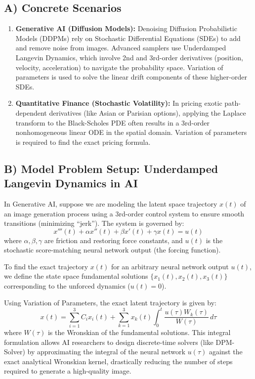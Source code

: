 \documentclass[12pt]{article}
\begin{document}
\subsection{A) Concrete Scenarios}
\begin{enumerate}
    \item \textbf{Generative AI (Diffusion Models):} Denoising Diffusion Probabilistic Models (DDPMs) rely on Stochastic Differential Equations (SDEs) to add and remove noise from images. Advanced samplers use Underdamped Langevin Dynamics, which involve 2nd and 3rd-order derivatives (position, velocity, acceleration) to navigate the probability space. Variation of parameters is used to solve the linear drift components of these higher-order SDEs.
    \item \textbf{Quantitative Finance (Stochastic Volatility):} In pricing exotic path-dependent derivatives (like Asian or Parisian options), applying the Laplace transform to the Black-Scholes PDE often results in a 3rd-order nonhomogeneous linear ODE in the spatial domain. Variation of parameters is required to find the exact pricing formula.
\end{enumerate}

\subsection{B) Model Problem Setup: Underdamped Langevin Dynamics in AI}
In Generative AI, suppose we are modeling the latent space trajectory $x(t)$ of an image generation process using a 3rd-order control system to ensure smooth transitions (minimizing ``jerk''). The system is governed by:
\[ x'''(t) + \alpha x''(t) + \beta x'(t) + \gamma x(t) = u(t) \]
where $\alpha, \beta, \gamma$ are friction and restoring force constants, and $u(t)$ is the stochastic score-matching neural network output (the forcing function).

To find the exact trajectory $x(t)$ for an arbitrary neural network output $u(t)$, we define the state space fundamental solutions $\{x_1(t), x_2(t), x_3(t)\}$ corresponding to the unforced dynamics ($u(t)=0$). 

Using Variation of Parameters, the exact latent trajectory is given by:
\[ x(t) = \sum_{i=1}^3 C_i x_i(t) + \sum_{k=1}^3 x_k(t) \int_0^t \frac{u(\tau) W_k(\tau)}{W(\tau)} \, d\tau \]
where $W(\tau)$ is the Wronskian of the fundamental solutions. This integral formulation allows AI researchers to design discrete-time solvers (like DPM-Solver) by approximating the integral of the neural network $u(\tau)$ against the exact analytical Wronskian kernel, drastically reducing the number of steps required to generate a high-quality image.
\end{document}

